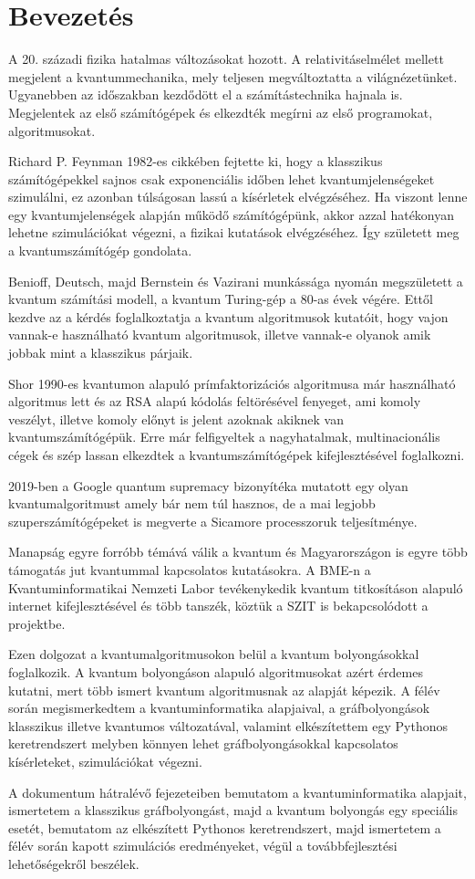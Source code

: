 \chapter{Bevezetés}

A 20. századi fizika hatalmas változásokat hozott. A relativitáselmélet mellett
megjelent a kvantummechanika, mely teljesen megváltoztatta a világnézetünket.
Ugyanebben az időszakban kezdődött el a számítástechnika hajnala is. Megjelentek
az első számítógépek és elkezdték megírni az első programokat, algoritmusokat.

Richard P. Feynman 1982-es cikkében fejtette ki, hogy a klasszikus számítógépekkel
sajnos csak exponenciális időben lehet kvantumjelenségeket szimulálni, ez azonban
túlságosan lassú a kísérletek elvégzéséhez. Ha viszont lenne egy kvantumjelenségek
alapján működő számítógépünk, akkor azzal hatékonyan lehetne szimulációkat végezni,
a fizikai kutatások elvégzéséhez. Így született meg a kvantumszámítógép gondolata.

Benioff, Deutsch, majd Bernstein és Vazirani munkássága nyomán megszületett a
kvantum számítási modell, a kvantum Turing-gép a 80-as évek végére. Ettől kezdve
az a kérdés foglalkoztatja a kvantum algoritmusok kutatóit, hogy vajon vannak-e
használható kvantum algoritmusok, illetve vannak-e olyanok amik jobbak mint a
klasszikus párjaik.

Shor 1990-es kvantumon alapuló prímfaktorizációs algoritmusa már használható
algoritmus lett és az RSA alapú kódolás feltörésével fenyeget, ami komoly
veszélyt, illetve komoly előnyt is jelent azoknak akiknek van kvantumszámítógépük.
Erre már felfigyeltek a nagyhatalmak, multinacionális cégek és szép lassan elkezdtek
a kvantumszámítógépek kifejlesztésével foglalkozni.

2019-ben a Google quantum supremacy bizonyítéka mutatott egy olyan kvantumalgoritmust
amely bár nem túl hasznos, de a mai legjobb szuperszámítógépeket is megverte a
Sicamore processzoruk teljesítménye.

Manapság egyre forróbb témává válik a kvantum és Magyarországon is egyre több
támogatás jut kvantummal kapcsolatos kutatásokra. A BME-n a Kvantuminformatikai
Nemzeti Labor tevékenykedik kvantum titkosításon alapuló internet kifejlesztésével
és több tanszék, köztük a SZIT is bekapcsolódott a projektbe.

Ezen dolgozat a kvantumalgoritmusokon belül a kvantum bolyongásokkal foglalkozik.
A kvantum bolyongáson alapuló algoritmusokat azért érdemes kutatni, mert több
ismert kvantum algoritmusnak az alapját képezik. A félév során megismerkedtem a
kvantuminformatika alapjaival, a gráfbolyongások klasszikus illetve kvantumos
változatával, valamint elkészítettem egy Pythonos keretrendszert melyben könnyen lehet
gráfbolyongásokkal kapcsolatos kísérleteket, szimulációkat végezni.

A dokumentum hátralévő fejezeteiben bemutatom a kvantuminformatika alapjait,
ismertetem a klasszikus gráfbolyongást, majd a kvantum bolyongás egy speciális
esetét, bemutatom az elkészített Pythonos keretrendszert, majd ismertetem
a félév során kapott szimulációs eredményeket, végül a továbbfejlesztési
lehetőségekről beszélek.